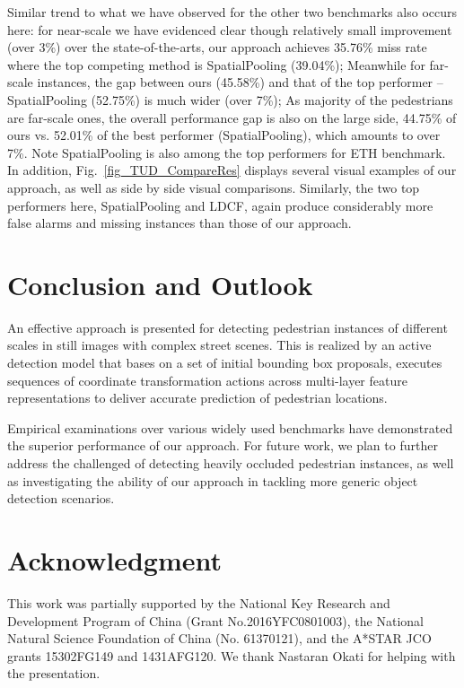 \documentclass[10pt,journal,compsoc,twoside]{IEEEtran}
\begin{document}
Similar trend to what we have observed for the other two benchmarks also occurs here:
for near-scale we have evidenced clear though relatively small improvement (over 3\%) over the state-of-the-arts,
our approach achieves 35.76\% miss rate where the top competing method is SpatialPooling (39.04\%);
Meanwhile for far-scale instances, the gap between ours (45.58\%) and that of the top performer -- SpatialPooling (52.75\%) is much wider (over 7\%);
As majority of the pedestrians are far-scale ones, the overall performance gap is also on the large side, 44.75\% of ours vs. 52.01\% of the best performer (SpatialPooling),
which amounts to over 7\%.
Note SpatialPooling is also among the top performers for ETH benchmark.
%
In addition, Fig.~\ref{fig_TUD_CompareRes} displays several visual examples of our approach, as well as side by side visual comparisons. %
Similarly,
the two top performers here, SpatialPooling and LDCF, again produce considerably more false alarms and missing instances than those of our approach.



\section{Conclusion and Outlook}
An effective approach is presented for detecting pedestrian instances of different scales in still images with complex street scenes.
This is realized by an active detection model that bases on a set of initial bounding box proposals,
executes sequences of coordinate transformation actions across multi-layer feature representations to deliver accurate prediction of pedestrian locations.

Empirical examinations over various widely used benchmarks have demonstrated the superior performance of our approach.
For future work, we plan to further address the challenged of detecting heavily occluded pedestrian instances,
as well as investigating the ability of our approach in tackling more generic object detection scenarios.


\section*{Acknowledgment}
This work was partially supported by the National Key Research and Development Program of China (Grant No.2016YFC0801003), the National Natural Science Foundation of China (No. 61370121), and the A*STAR JCO grants 15302FG149 and 1431AFG120. We thank Nastaran Okati for helping with the presentation. %




%

\end{document}
